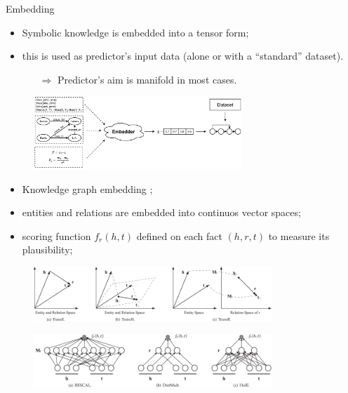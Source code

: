 \documentclass[presentation]{beamer}\mode<presentation>{\usetheme{AMSBolognaFC}}
\begin{document}
\begin{frame}[allowframebreaks]{Embedding}
    \begin{itemize}
        \item Symbolic knowledge is embedded into a tensor form;
        \item this is used as predictor's input data (alone or with a ``standard'' dataset).
        \begin{itemize}
            \item[$\Rightarrow$] Predictor's aim is manifold in most cases.
        \end{itemize} 
    \end{itemize}
    
    \begin{figure}
        \centering
        \includegraphics[width=0.7\textwidth]{figures/ski-embedding}
    \end{figure}
    \framebreak
    \begin{itemize}
        \item Knowledge graph embedding ;
        \item entities and relations are embedded into continuos vector spaces;
        \item scoring function $f_{r}(h,t)$ defined on each fact $(h, r, t)$ to measure its plausibility;
    \end{itemize}
    \begin{figure}
        \centering
        \includegraphics[width=0.8\textwidth]{figures/kge-space.png}
    \end{figure}

    \framebreak
    
    \begin{figure}
        \centering
        \includegraphics[width=0.8\textwidth]{figures/kge-nn-1.png}
    \end{figure}


\end{frame}
\end{document}
